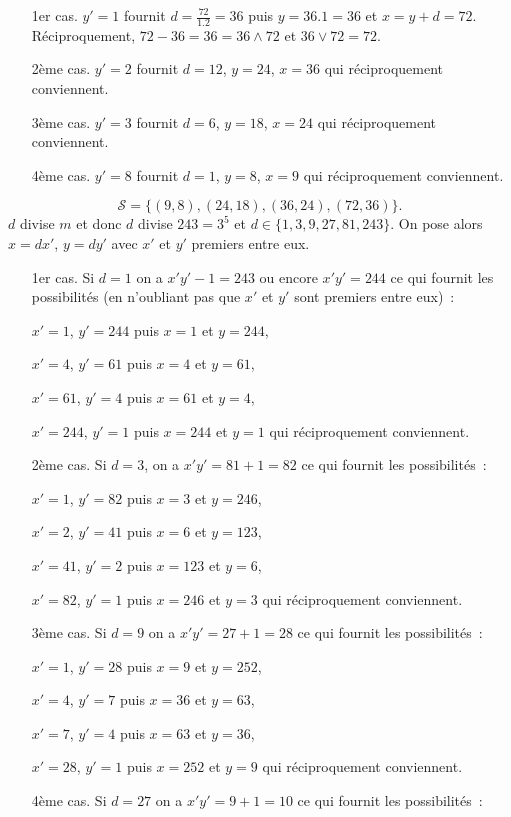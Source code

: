 {{\begin{itemize}
\item[1er cas.] $y'=1$ fournit $d=\frac{72}{1.2}=36$ puis $y=36.1=36$ et $x=y+d=72$. Réciproquement, $72-36=36=36\wedge72$ et $36\vee72=72$.
\item[2ème cas.] $y'=2$ fournit $d=12$, $y=24$, $x=36$ qui réciproquement conviennent.
\item[3ème cas.] $y'=3$ fournit $d=6$, $y=18$, $x=24$ qui réciproquement conviennent.
\item[4ème cas.] $y'= 8$ fournit $d=1$, $y=8$, $x=9$ qui réciproquement conviennent.
\end{itemize}

$$\mathcal{S}=\{(9,8),(24,18),(36,24),(72,36)\}.$$
$d$ divise $m$ et donc $d$ divise $243=3^5$ et $d\in\{1,3,9,27,81,243\}$. On pose alors $x=dx'$, $y=dy'$ avec $x'$ et $y'$ premiers entre eux.

\begin{itemize}
\item[1er cas.] Si $d=1$ on a $x'y'-1=243$ ou encore $x'y'=244$ ce qui fournit les possibilités (en n'oubliant pas que $x'$ et $y'$ sont premiers entre eux)~:

$x'=1$, $y'=244$ puis $x=1$ et $y=244$, 

$x'=4$, $y'=61$ puis $x=4$ et $y=61$,

$x'=61$, $y'=4$ puis $x=61$ et $y=4$,
 
$x'=244$, $y'=1$ puis $x=244$ et $y=1$ qui réciproquement conviennent.
\item[2ème cas.] Si $d=3$, on a $x'y'=81+1=82$ ce qui fournit les possibilités~:

$x'=1$, $y'=82$ puis $x=3$ et $y=246$,
 
$x'=2$, $y'=41$ puis $x=6$ et $y=123$,

$x'=41$, $y'=2$ puis $x=123$ et $y=6$,
 
$x'=82$, $y'=1$ puis $x=246$ et $y=3$ qui réciproquement conviennent.
\item[3ème cas.] Si $d=9$ on a $x'y'=27+1=28$ ce qui fournit les possibilités~:

$x'=1$, $y'=28$ puis $x=9$ et $y=252$,
 
$x'=4$, $y'=7$ puis $x=36$ et $y=63$,

$x'=7$, $y'=4$ puis $x=63$ et $y=36$,
 
$x'=28$, $y'=1$ puis $x=252$ et $y=9$ qui réciproquement conviennent.
\item[4ème cas.] Si $d=27$ on a $x'y'=9+1=10$ ce qui fournit les possibilités~:


\end{itemize}}}
